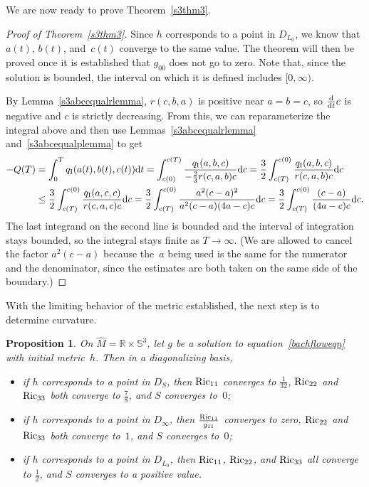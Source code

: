 \documentclass[10pt,a4paper]{amsart}
\numberwithin{equation}{section}
\newtheorem{Proposition}[Theorem]{Proposition}
 { \theoremstyle{definition}
\newtheorem{Definition}[Theorem]{Definition}
\newtheorem{Example}[Theorem]{Example}
\newtheorem{Remark}[Theorem]{Remark} }
\newcommand{\dtime}{\frac{{\rm d}}{{\rm d} t}} %
\begin{document}
We are now ready to prove Theorem~\ref{s3thm3}.

\begin{proof}[Proof of Theorem~\ref{s3thm3}]
Since $h$ corresponds to a point in $D_{L_0}$, we know that $a(t)$, $b(t)$, and~$c(t)$ converge to the same value. The theorem will then be proved once it is established that $g_{00}$ does not go to zero.
Note that, since the solution is bounded, the interval on which it is defined includes $[0, \infty)$.

By Lemma~\ref{s3abcequalrlemma}, $r(c, b, a)$ is positive near $a = b = c$, so $\dtime c$ is negative and $c$ is strictly decreasing. From this, we can reparameterize the integral above and then use Lemmas~\ref{s3abcequalrlemma} and~\ref{s3abcequalplemma} to get
\begin{align*}
-Q(T) &= \int_0^T q_{\rm I}(a(t), b(t), c(t)) {\rm d}t
	= \int_{c(0)}^{c(T)} \frac{q_{\rm I}(a, b, c)}{-\frac{2}{3} r(c, a, b) c} {\rm d} c
	= \frac{3}{2} \int_{c(T)}^{c(0)} \frac{q_{\rm I}(a, b, c)}{r(c, a, b) c} {\rm d} c \\
	& \leq \frac{3}{2} \int_{c(T)}^{c(0)} \frac{q_{\rm I}(a, c, c)}{r(c, a, c) c} {\rm d} c
= \frac{3}{2} \int_{c(T)}^{c(0)} \frac{a^2(c-a)^2}{a^2(c-a)(4a-c) c} {\rm d} c
	= \frac{3}{2} \int_{c(T)}^{c(0)} \frac{(c-a)}{(4a-c) c} {\rm d} c.
\end{align*}
The last integrand on the second line is bounded and the interval of integration stays bounded, so the integral stays finite as $T \rightarrow \infty$. (We are allowed to cancel the factor $a^2 (c-a)$ because the~$a$ being used is the same for the numerator and the denominator, since the estimates are both taken on the same side of the boundary.)
\end{proof}

With the limiting behavior of the metric established, the next step is to determine curvature.

\begin{Proposition} \label{s3ricprop}
On $\widehat{M} = \mathbb{R} \times \mathbb{S}^3$, let $g$ be a solution to equation~\eqref{bachfloweqn} with initial metric~$h$. Then in a diagonalizing basis,
\begin{itemize}\itemsep=0pt
\item if $h$ corresponds to a point in $D_S$, then ${\rm Ric}_{11}$ converges to $\frac{1}{32}$, ${\rm Ric}_{22}$ and ${\rm Ric}_{33}$ both converge to $\frac{7}{8}$, and $S$ converges to~$0$;
\item if $h$ corresponds to a point in $D_{\infty}$, then $\frac{{\rm Ric}_{11}}{g_{11}}$ converges to zero, ${\rm Ric}_{22}$ and ${\rm Ric}_{33}$ both converge to~$1$, and $S$ converges to~$0$;
\item if $h$ corresponds to a point in $D_{L_0}$, then ${\rm Ric}_{11}$, ${\rm Ric}_{22}$, and ${\rm Ric}_{33}$ all converge to $\frac{1}{2}$, and $S$ converges to a positive value.
\end{itemize}
\end{Proposition}
\end{document}
